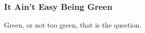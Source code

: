 \documentclass[handout]{beamer}
\begin{document}
\begin{frame}
\frametitle{It Ain't Easy Being Green}
Green, or not too green, that is the question.
\end{frame}
\end{document}
